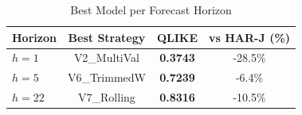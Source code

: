 \begin{table}[htbp]
\centering
\caption{Best Model per Forecast Horizon}
\label{tab:best_per_horizon}
\begin{tabular}{lccc}
\toprule
Horizon & Best Strategy & QLIKE & vs HAR-J (\%) \\
\midrule
$h=1$ & V2\_MultiVal & \textbf{0.3743} & -28.5\% \\
$h=5$ & V6\_TrimmedW & \textbf{0.7239} & -6.4\% \\
$h=22$ & V7\_Rolling & \textbf{0.8316} & -10.5\% \\
\bottomrule
\end{tabular}
\end{table}